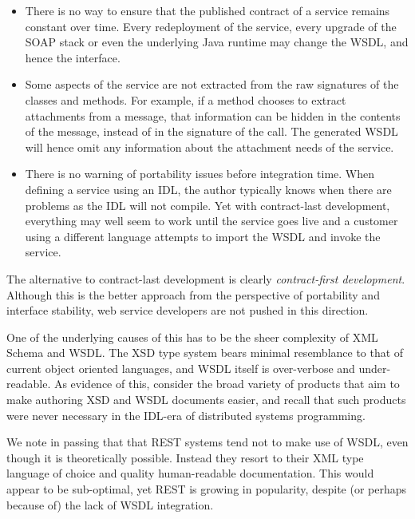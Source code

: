 \begin{itemize}

\item
    
There is no way to ensure that the published contract of a service
remains constant over time. Every redeployment of the service, every
upgrade of the SOAP stack or even the underlying Java runtime may
change the WSDL, and hence the interface.

\item

Some aspects of the service are not extracted from the raw signatures
of the classes and methods. For example, if a method chooses to
extract attachments from a message, that information can be hidden in
the contents of the message, instead of in the signature of the
call. The generated WSDL will hence omit any information about the
attachment needs of the service.

\item

There is no warning of portability issues before integration time.
When defining a service using an IDL, the author typically knows when
there are problems as the IDL will not compile. Yet with contract-last
development, everything may well seem to work until the service goes
live and a customer using a different language attempts to import the
WSDL and invoke the service.
    
\end{itemize}

The alternative to contract-last development is clearly \emph{contract-first
development}. Although this is the better approach from the perspective
of portability and interface stability, web service developers are not
pushed in this direction.

One of the underlying causes of this has to be the sheer complexity of
XML Schema and WSDL. The XSD type system bears minimal resemblance to
that of current object oriented languages, and WSDL itself is
over-verbose and under-readable. As evidence of this, consider the
broad variety of products that aim to make authoring XSD and WSDL
documents easier, and recall that such products were never necessary
in the IDL-era of distributed systems programming.

We note in passing that that REST systems \cite{fielding:rest} tend not to
make use of WSDL, even though it is theoretically possible. Instead
they resort to their XML type language of choice and quality
human-readable documentation. This would appear to be sub-optimal, yet
REST is growing in popularity, despite (or perhaps because of) the
lack of WSDL integration.

